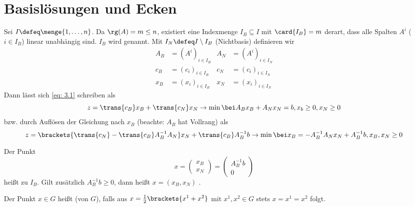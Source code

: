 \section{Basislösungen und Ecken}

Sei $I \defeq \menge{1, \dots , n}$. Da $\rg(A) = m \le n$, existiert eine Indexmenge $I_B \subseteq I$ mit $\card{I_B} = m$ derart, dass alle Spalten $A^i$ ($i \in I_B$) linear unabhängig sind. $I_B$ wird  genannt. Mit $I_N \defeq I \setminus I_B$ (Nichtbasis) definieren wir
\begin{align*}
A_B &= (A^i)_{i \in I_B} & A_N &= (A^i)_{i \in I_N} \\
c_B &= (c_i)_{i \in I_B} & c_N &= (c_i)_{i \in I_N} \\
x_B &= (x_i)_{i \in I_B} & x_N &= (x_i)_{i \in I_N}
\end{align*}
Dann lässt sich \eqref{eq: 3.1} schreiben als
\begin{equation}
	z = \trans{c_B} x_B + \trans{c_N} x_N \to \min \bei A_B x_B + A_N x_N = b, x_b \ge 0, x_N \ge 0 \label{eq: 3.2}
\end{equation}
bzw. durch Auflösen der Gleichung nach $x_B$ (beachte: $A_B$ hat Vollrang) als
\begin{equation}
	z = \brackets{\trans{c_N} - \trans{c_B} A_B^{-1}A_N} x_N + \trans{c_B} A_B^{-1} b \to \min \bei x_B = -A_B^{-1} A_N x_N + A_B^{-1}b, x_B, x_N \ge 0 \label{eq: 3.3}
\end{equation}

\begin{definition} %
	Der Punkt 
	\begin{equation*}
		x = \left(\begin{matrix} x_B \\ x_N \end{matrix} \right) = \left( \begin{matrix} A_B^{-1} b \\ 0 \end{matrix} \right)
	\end{equation*}
	heißt  zu  $I_B$. Gilt zusätzlich $A_B^{-1}b \ge 0$, dann heißt $x=(x_B,x_N)$ .
\end{definition}

\begin{definition} %
	Der Punkt $x \in G$ heißt  (von $G$), falls aus $x = \frac{1}{2} \brackets{x^1 + x^2}$ mit $x^1,x^2 \in G$ stets $x = x^1 = x^2$ folgt.
\end{definition}

